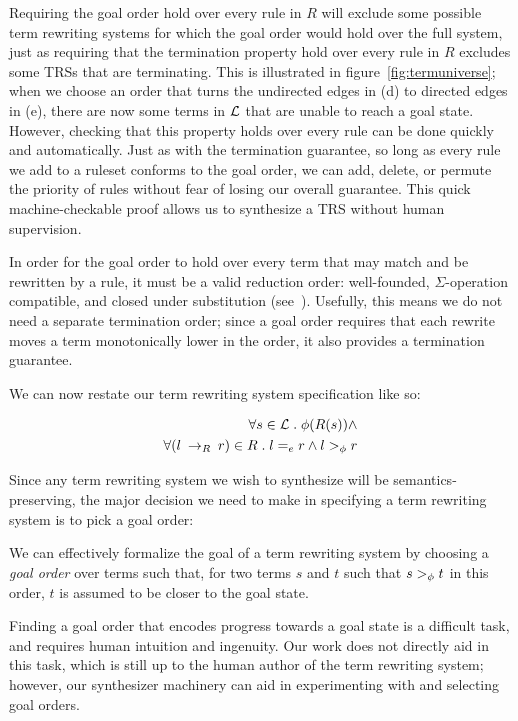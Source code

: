 Requiring the goal order hold over every rule in $R$ will exclude some possible term rewriting systems for which the goal order would hold over the full system, just as requiring that the termination property hold over every rule in $R$ excludes some TRSs that are terminating. This is illustrated in figure~\ref{fig:termuniverse}; when we choose an order that turns the undirected edges in (d) to directed edges in (e), there are now some terms in $\mathcal{L}$ that are unable to reach a goal state. However, checking that this property holds over every rule can be done quickly and automatically. Just as with the termination guarantee, so long as every rule we add to a ruleset conforms to the goal order, we can add, delete, or permute the priority of rules without fear of losing our overall guarantee. This quick machine-checkable proof allows us to synthesize a TRS without human supervision.

In order for the goal order to hold over every term that may match and be rewritten by a rule, it must be a valid reduction order: well-founded, $\Sigma$-operation compatible, and closed under substitution (see~\cite{baader1999term}). Usefully, this means we do not need a separate termination order; since a goal order requires that each rewrite moves a term monotonically lower in the order, it also provides a termination guarantee.

We can now restate our term rewriting system specification like so:

\begin{align*}
    \forall s \in \mathcal{L} \;.\; \phi(R(s)) \wedge \\
    \forall (l \:\rightarrow_{R}\: r) \in R \;.\; l =_e r \wedge l >_{\phi} r
\end{align*}

Since any term rewriting system we wish to synthesize will be semantics-preserving, the major decision we need to make in specifying a term rewriting system is to pick a goal order:

\begin{assumption}
We can effectively formalize the goal of a term rewriting system by choosing a \emph{goal order} over terms such that, for two terms $s$ and $t$ such that $s >_{\phi} t$ in this order, $t$ is assumed to be closer to the goal state.
\end{assumption}

Finding a goal order that encodes progress towards a goal state is a difficult task, and requires human intuition and ingenuity. Our work does not directly aid in this task, which is still up to the human author of the term rewriting system; however, our synthesizer machinery can aid in experimenting with and selecting goal orders.

